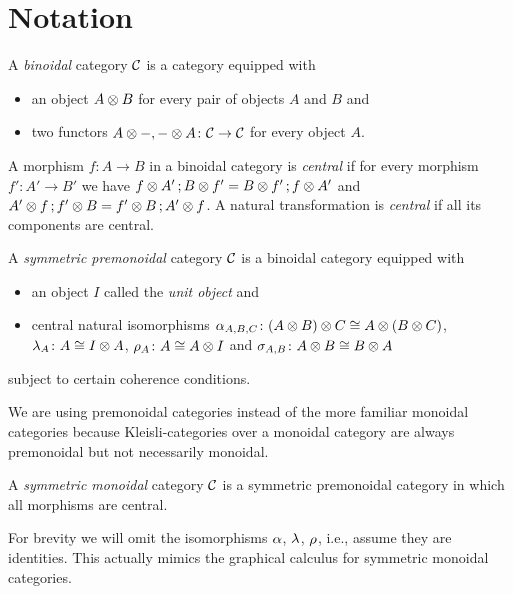 \documentclass[runningheads,envcountsame]{llncs}
\begin{document}
\section{Notation}

\begin{definition}
    A \emph{binoidal} category $\mathcal{C}$ is a category equipped with
    \begin{itemize}
        \item an object $\tensor{A}{B}$ for every pair of objects $A$ and $B$ and
        \item two functors $\tensor{A}{-}, \tensor{-}{A}\colon \C \to \C$ for every object $A$.
    \end{itemize}
    
    A morphism $f\colon A \to B$ in a binoidal category is \emph{central} if for every morphism $f'\colon A' \to B'$ we have $\comp{\tensor{f}{A'}}{\tensor{B}{f'}} = \comp{\tensor{B}{f'}}{\tensor{f}{A'}}$ and $\comp{\tensor{A'}{f}}{\tensor{f'}{B}} = \comp{\tensor{f'}{B}}{\tensor{A'}{f}}$. 
    A natural transformation is \emph{central} if all its components are central.
    
    A \emph{symmetric premonoidal} category $\mathcal{C}$ is a binoidal category equipped with
    \begin{itemize}
        \item an object $I$ called the \emph{unit object} and
        \item central natural isomorphisms $\assoc_{A,B,C}\colon \tensor{(\tensor{A}{B})}{C} \cong \tensor{A}{(\tensor{B}{C})}$, $\unitl_{A}\colon A \cong \tensor{I}{A}$, $\unitr_{A}\colon A \cong \tensor{A}{I}$ and $\swap_{A,B}\colon \tensor{A}{B} \cong \tensor{B}{A}$
    \end{itemize}
    subject to certain coherence conditions.
\end{definition}

\begin{remark}
    We are using premonoidal categories instead of the more familiar monoidal categories because Kleisli-categories over a monoidal category are always premonoidal but not necessarily monoidal.
\end{remark}

\begin{remark}
    A \emph{symmetric monoidal} category $\mathcal{C}$ is a symmetric premonoidal category in which all morphisms are central.
\end{remark}

For brevity we will omit the isomorphisms $\assoc$, $\unitl$, $\unitr$, i.e., assume they are identities. This actually mimics the graphical calculus for symmetric monoidal categories. 
\end{document}
